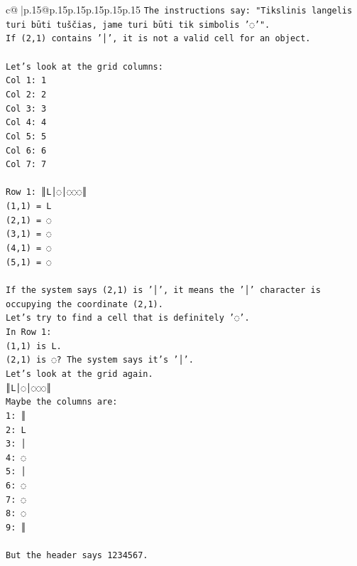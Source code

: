 \documentclass{article}
\begin{document}
{\begin{supertabular}{c@{$\;$}|p{.15\linewidth}@{}p{.15\linewidth}p{.15\linewidth}p{.15\linewidth}p{.15\linewidth}p{.15\linewidth}}
{{{\texttt{The instructions say: "Tikslinis langelis turi būti tuščias, jame turi būti tik simbolis '◌'".} \\
\texttt{If (2,1) contains '│', it is not a valid cell for an object.} \\
\\ 
\texttt{Let's look at the grid columns:} \\
\texttt{Col 1: 1} \\
\texttt{Col 2: 2} \\
\texttt{Col 3: 3} \\
\texttt{Col 4: 4} \\
\texttt{Col 5: 5} \\
\texttt{Col 6: 6} \\
\texttt{Col 7: 7} \\
\\ 
\texttt{Row 1: ║L│◌│◌◌◌║} \\
\texttt{(1,1) = L} \\
\texttt{(2,1) = ◌} \\
\texttt{(3,1) = ◌} \\
\texttt{(4,1) = ◌} \\
\texttt{(5,1) = ◌} \\
\\ 
\texttt{If the system says (2,1) is '│', it means the '│' character is occupying the coordinate (2,1).} \\
\texttt{Let's try to find a cell that is definitely '◌'.} \\
\texttt{In Row 1:} \\
\texttt{(1,1) is L.} \\
\texttt{(2,1) is ◌? The system says it's '│'.} \\
\texttt{Let's look at the grid again.} \\
\texttt{║L│◌│◌◌◌║} \\
\texttt{Maybe the columns are:} \\
\texttt{1: ║} \\
\texttt{2: L} \\
\texttt{3: │} \\
\texttt{4: ◌} \\
\texttt{5: │} \\
\texttt{6: ◌} \\
\texttt{7: ◌} \\
\texttt{8: ◌} \\
\texttt{9: ║} \\
\\ 
\texttt{But the header says 1234567.} \\
}}}
\end{supertabular}}
\end{document}
